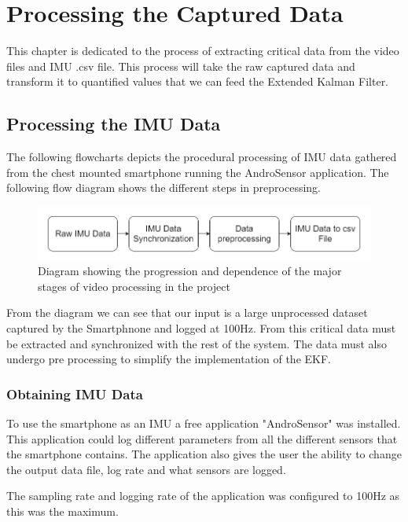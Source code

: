 \chapter{Processing the Captured Data}
This chapter is dedicated to the process of extracting critical data from the video files and IMU .csv file. This process will take the raw captured data and transform it to quantified values that we can feed the Extended Kalman Filter.



\section{Processing the IMU Data}
The following flowcharts depicts the procedural processing of IMU data gathered from the chest mounted smartphone running the AndroSensor application. The following flow diagram shows the different steps in preprocessing.

\begin{figure}[!ht]
\includegraphics[width=\linewidth]{figures/imuflow.png}
\caption{Diagram showing the progression and dependence of the major stages of video processing in the project}
\label{fig:imuflow}
\end{figure}

From the diagram we can see that our input is a large unprocessed dataset captured by the Smartphnone and logged at 100Hz. From this critical data must be extracted and synchronized with the rest of the system. The data must also undergo pre processing to simplify the implementation of the EKF. 

\subsection{Obtaining IMU Data}
To use the smartphone as an IMU a free application "AndroSensor" \cite{androsensor} was installed. This application could log different parameters from all the different sensors that the smartphone contains. The application also gives the user the ability to change the output data file, log rate and what sensors are logged.

The sampling rate and logging rate of the application was configured to 100Hz as this was the maximum.


